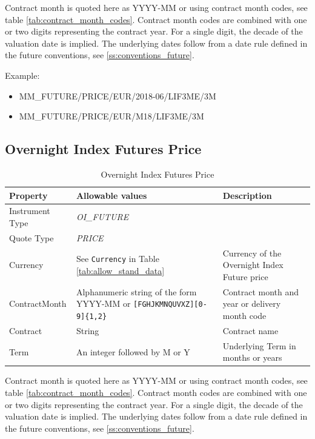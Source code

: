 Contract month is quoted here as YYYY-MM or using contract month codes, see table \ref{tab:contract_month_codes}. Contract
month codes are combined with one or two digits representing the contract year. For a single digit, the decade of the
valuation date is implied. The underlying dates follow from a date rule defined in the future conventions, see
\ref{ss:conventions_future}.

\medskip
Example:
\begin{itemize}
\item {MM\_FUTURE/PRICE/EUR/2018-06/LIF3ME/3M}
\item {MM\_FUTURE/PRICE/EUR/M18/LIF3ME/3M}
\end{itemize}

\subsection{Overnight Index Futures Price}\label{ss:market_data_oi_index_future_prices}

\begin{table}[H]
\centering
  \begin{tabular}{|p{3cm}|p{4.5cm}|p{7cm}|}
  \hline
    {\bf Property} & {\bf Allowable values} & {\bf Description} \\ \hline
    Instrument Type & \emph{OI\_FUTURE} & \\ \hline
    Quote Type & \emph{PRICE} & \\ \hline
    Currency & See \lstinline!Currency! in Table \ref{tab:allow_stand_data}& Currency of the Overnight Index Future price\\ \hline
    ContractMonth & Alphanumeric string of the form YYYY-MM or \texttt{[FGHJKMNQUVXZ][0-9]\{1,2\}} & Contract month and year or delivery month code\\ \hline
    Contract & String & Contract name\\ \hline
    Term & An integer followed by M or Y & Underlying Term in months or years \\ \hline
  \end{tabular}
  \caption{Overnight Index Futures Price}
  \label{tab:oifp_quote}
\end{table}

Contract month is quoted here as YYYY-MM or using contract month codes, see table \ref{tab:contract_month_codes}. Contract
month codes are combined with one or two digits representing the contract year. For a single digit, the decade of the
valuation date is implied. The underlying dates follow from a date rule defined in the future conventions, see
\ref{ss:conventions_future}.

